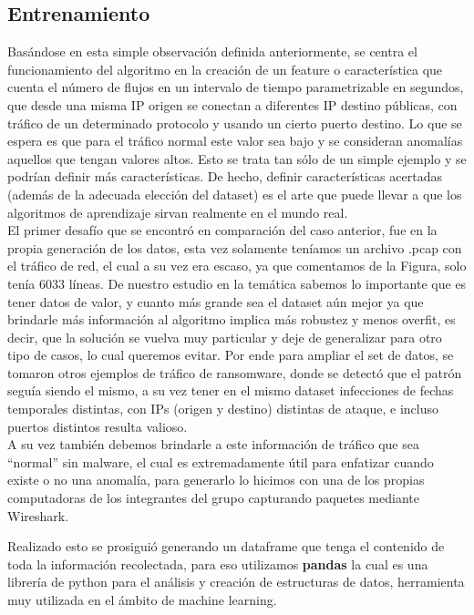 \documentclass[a4paper,10pt]{article}
\begin{document}
\subsection{Entrenamiento}

Basándose en esta simple observación definida anteriormente, se centra el funcionamiento del algoritmo en la creación de un feature o característica que cuenta el número de flujos en un intervalo de tiempo parametrizable en segundos, que desde una misma IP origen se conectan a diferentes IP destino públicas, con tráfico de un determinado protocolo y usando un cierto puerto destino. Lo que se espera es que para el tráfico normal este valor sea bajo y se consideran anomalías aquellos que tengan valores altos. Esto se trata tan sólo de un simple ejemplo y se podrían definir más características. De hecho, definir características acertadas (además de la adecuada elección del dataset) es el arte que puede llevar a que los algoritmos de aprendizaje sirvan realmente en el mundo real.\\

El primer desafío que se encontró en comparación del caso anterior, fue en la propia generación de los datos, esta vez solamente teníamos un archivo .pcap con el tráfico de red, el cual a su vez era escaso, ya que comentamos de la Figura, solo tenía 6033 líneas. De nuestro estudio en la temática sabemos lo importante que es tener datos de valor, y cuanto más grande sea el dataset aún mejor ya que brindarle más información al algoritmo implica más robustez y menos overfit, es decir, que la solución se vuelva muy particular y deje de generalizar para otro tipo de casos, lo cual queremos evitar. Por ende para ampliar el set de datos, se tomaron otros ejemplos de tráfico de ransomware, donde se detectó que el patrón seguía siendo el mismo, a su vez tener en el mismo dataset infecciones de fechas temporales distintas, con IPs (origen y destino) distintas de ataque, e incluso puertos distintos resulta valioso.\\

A su vez también debemos brindarle a este información de tráfico que sea “normal” sin malware, el cual es extremadamente útil para enfatizar cuando existe o no una anomalía, para generarlo lo hicimos con una de los propias computadoras de los integrantes del grupo capturando paquetes mediante Wireshark.\\


\medskip

Realizado esto se prosiguió generando un dataframe que tenga el contenido de toda la información recolectada, para eso utilizamos \textbf{pandas} la cual es una librería de python para el análisis y creación de estructuras de datos, herramienta muy utilizada en el ámbito de machine learning. \\
\end{document}
